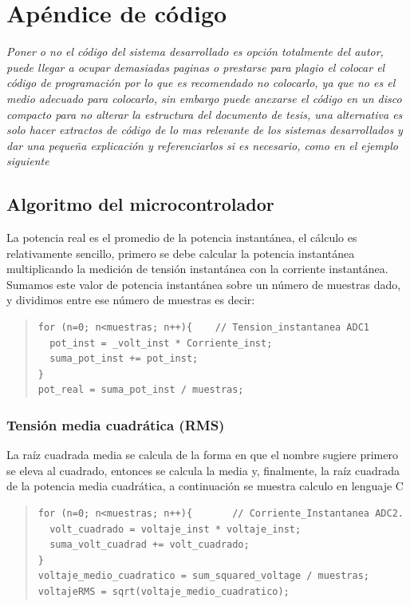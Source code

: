 \chapter{ Apéndice de código }

\textit{Poner o no el código del sistema desarrollado es opción totalmente del autor, puede llegar a ocupar demasiadas paginas o prestarse para plagio el colocar el código de programación por lo que es recomendado no colocarlo, ya que no es el medio adecuado para colocarlo, sin embargo puede anexarse el código en un disco compacto para no alterar la estructura del documento de tesis, una alternativa es solo hacer extractos de código de lo mas relevante de los sistemas desarrollados y dar una pequeña explicación y referenciarlos si es necesario, como en el ejemplo siguiente}

\section{ Algoritmo del microcontrolador }

La potencia real es el promedio de la potencia instantánea, el cálculo es relativamente sencillo, primero se debe calcular la potencia instantánea multiplicando la medición de tensión instantánea con la corriente instantánea. Sumamos este valor de potencia instantánea sobre un número de muestras dado, y dividimos entre ese número de muestras es decir: 

\begin{quote}
\begin{verbatim}
for (n=0; n<muestras; n++){    // Tension_instantanea ADC1
  pot_inst = _volt_inst * Corriente_inst;
  suma_pot_inst += pot_inst;
}
pot_real = suma_pot_inst / muestras;
\end{verbatim}
\end{quote}

\subsection{ Tensi\'{o}n media cuadr\'{a}tica (RMS) } 

La raíz cuadrada media se calcula de la forma en que el nombre sugiere primero se eleva al cuadrado, entonces se calcula la media y, finalmente, la raíz cuadrada de la potencia media cuadrática, a continuación se muestra calculo en lenguaje C

\begin{quote}
\begin{verbatim}
for (n=0; n<muestras; n++){ 	  // Corriente_Instantanea ADC2.
  volt_cuadrado = voltaje_inst * voltaje_inst;
  suma_volt_cuadrad += volt_cuadrado;
}
voltaje_medio_cuadratico = sum_squared_voltage / muestras;
voltajeRMS = sqrt(voltaje_medio_cuadratico);
\end{verbatim}
\end{quote}

